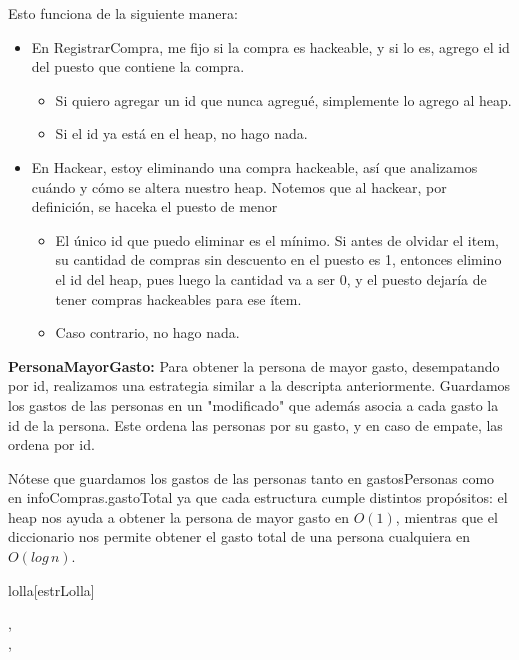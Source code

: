 \documentclass[../main.tex]{subfiles}
\begin{document}
\begin{representacion}
{Esto funciona de la siguiente manera:
\begin{itemize}
    \item En RegistrarCompra, me fijo si la compra es hackeable, y si lo es, agrego el id del puesto que contiene la compra. 
    \begin{itemize}
        \item Si quiero agregar un id que nunca agregué, simplemente lo agrego al heap.
        \item Si el id ya está en el heap, no hago nada.
    \end{itemize}
    \item En Hackear, estoy eliminando una compra hackeable, así que analizamos cuándo y cómo se altera nuestro heap.
    Notemos que al hackear, por definición, se haceka el puesto de menor 
    \begin{itemize}
        \item El único id que puedo eliminar es el mínimo. Si antes de olvidar el item, su cantidad de compras sin descuento en el puesto es 1, entonces elimino el id del heap, pues luego la cantidad va a ser 0, y el puesto dejaría de tener compras hackeables para ese ítem.
    \item Caso contrario, no hago nada.
    \end{itemize}
\end{itemize}

\textbf{PersonaMayorGasto: } Para obtener la persona de mayor gasto, desempatando por id, realizamos una estrategia similar a la descripta anteriormente.
Guardamos los gastos de las personas en un \maxHeap[] "modificado" que además asocia a cada gasto la id de la persona.
Este \maxHeap[] ordena las personas por su gasto, y en caso de empate, las ordena por id.

Nótese que guardamos los gastos de las personas tanto en gastosPersonas como en infoCompras.gastoTotal ya que cada estructura cumple 
distintos propósitos: el heap nos ayuda a obtener la persona de mayor gasto en $O(1)$, mientras que el diccionario nos permite obtener
el gasto total de una persona cualquiera en $O(log \,n)$.
}

\begin{Estructura}{lolla}[estrLolla]
    \begin{Tupla}[estrLolla]
        ,\\%
        ,\\%
    \end{Tupla}


\end{Estructura}
\end{representacion}
\end{document}
